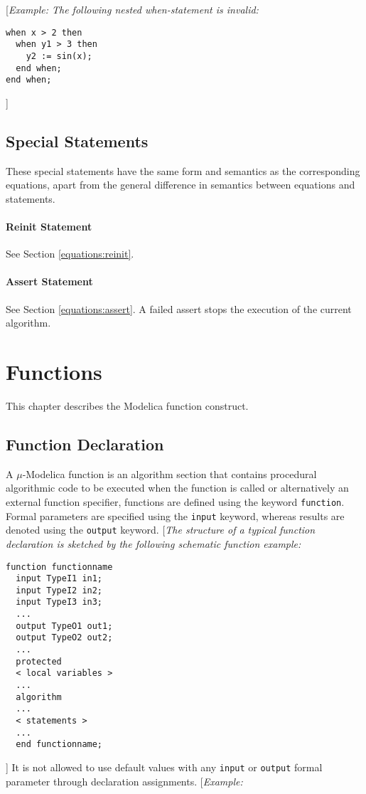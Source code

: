 \documentclass[11pt,a4paper,notitlepage]{report}
\begin{document}
[\emph{Example:
The following nested when-statement is invalid:}
\begin{verbatim}
when x > 2 then
  when y1 > 3 then
    y2 := sin(x);
  end when;
end when;
\end{verbatim}
]

\section{Special Statements}
These special statements have the same form and semantics as the corresponding equations, apart from the general difference in semantics between equations and statements.

\subsubsection{Reinit Statement}

See Section \ref{equations:reinit}.

\subsubsection{Assert Statement}

See Section \ref{equations:assert}. A failed assert stops the execution of the current algorithm.

\chapter{Functions}\label{ch:functions}
This chapter describes the Modelica function construct.

\section{Function Declaration}
A $\mu$-Modelica function is an algorithm section that contains procedural algorithmic code to be executed when the function is called or alternatively an external function specifier, functions are defined using the keyword \verb"function". Formal parameters are specified using the
\verb"input" keyword, whereas results are denoted using the \verb"output" keyword.
[\emph{The structure of a typical function declaration is sketched by the following schematic function example:}
\begin{verbatim}
function functionname
  input TypeI1 in1;
  input TypeI2 in2;
  input TypeI3 in3;
  ...
  output TypeO1 out1;
  output TypeO2 out2;
  ...
  protected
  < local variables >
  ...
  algorithm
  ...
  < statements >
  ...
  end functionname;
\end{verbatim}
]
It is not allowed to use default values with any \verb"input" or \verb"output" formal parameter through declaration assignments. 
[\emph{Example:}
\end{document}
